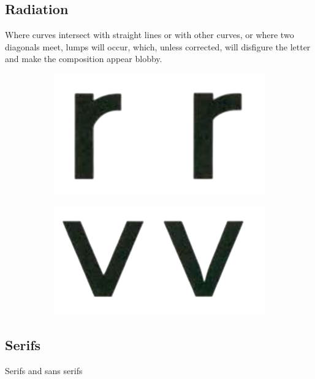 \subsection{Radiation}

  \begin{theorem}[Radiation]
    Where curves intersect with straight lines or with other curves, or where two diagonals meet, lumps will occur, which, unless corrected, will disfigure the letter and make the composition appear blobby. 

    \begin{figure}[H]
      \centering
      \begin{subfigure}[b]{0.45\textwidth}
        \centering
        \includegraphics[width=\textwidth]{img/r.png}
        \caption{}
        \label{fig:r}
      \end{subfigure}
      \hfill 
      \begin{subfigure}[b]{0.48\textwidth}
        \centering
        \includegraphics[width=\textwidth]{img/v.png}
        \caption{}
        \label{fig:v}
      \end{subfigure}
      \caption{}
      \label{fig:blob}
    \end{figure}
  \end{theorem}

\subsection{Serifs} 

  Serifs and sans serifs


